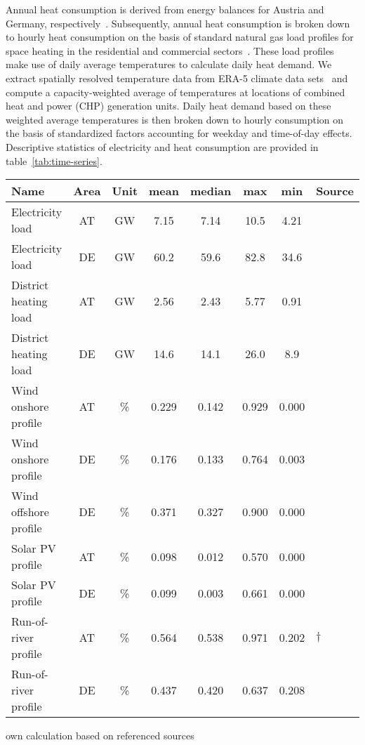 \documentclass[review, 3p, times, 12pt]{elsarticle} %
\begin{document}
Annual heat consumption is derived from energy balances for Austria and Germany, respectively~\citep{AGEB2018,
StatistikAustria2020}.
Subsequently, annual heat consumption is broken down to hourly heat consumption on the basis of standard natural gas load profiles for space heating in the residential and commercial sectors~\citep{Almbauer2008}.
These load profiles make use of daily average temperatures to calculate daily heat demand.
We extract spatially resolved temperature data from ERA-5 climate data sets~\citep{CCCS2017} and compute a capacity-weighted average of temperatures at locations of combined heat and power (CHP) generation units.
Daily heat demand based on these weighted average temperatures is then broken down to hourly consumption on the basis of standardized factors accounting for weekday and time-of-day effects.
Descriptive statistics of electricity and heat consumption are provided in table~\ref{tab:time-series}.

\begin{table*}[h!t]
\centering
\begin{threeparttable}
\caption{Descriptive data of time series (2016)}\label{tab:time-series}
\begin{tabular}{l c c c c c c l}
\toprule
Name & Area & Unit & mean & median & max & min & Source   \\
\midrule
Electricity load & AT & GW & 7.15 & 7.14 & 10.5 & 4.21 &\cite{opsd2019}     \\
Electricity load & DE & GW & 60.2 & 59.6 & 82.8 & 34.6 &\cite{opsd2019}     \\
District heating load\tnote{$\dagger$} & AT & GW & 2.56 & 2.43 & 5.77 & 0.91 & \cite{CCCS2017, StatistikAustria2020}\\
District heating load\tnote{$\dagger$} & DE & GW & 14.6 & 14.1 & 26.0 & 8.9 & \cite{CCCS2017, AGEB2018} \\
Wind onshore profile & AT &\%   & 0.229 & 0.142 & 0.929 & 0.000 &\cite{opsd2019}         \\
Wind onshore profile & DE &\%   & 0.176 & 0.133 & 0.764 & 0.003 &\cite{opsd2019}         \\
Wind offshore profile & DE &\%   & 0.371 & 0.327 & 0.900 & 0.000 &\cite{opsd2019}         \\
Solar PV profile\tnote{$\dagger$ } & AT &\%   & 0.098 & 0.012 & 0.570 & 0.000 & \cite{opsd2019, Biermayr2019}\\
Solar PV profile & DE &\%   & 0.099 & 0.003 & 0.661 & 0.000 &\cite{opsd2019}         \\
Run-of-river profile & AT &\%    & 0.564 & 0.538 & 0.971 & 0.202 & \cite{ENTSOE2020b}$\dagger$\\
Run-of-river profile & DE &\%   & 0.437 & 0.420 & 0.637 & 0.208 &\cite{ENTSOE2020b}\\
\bottomrule
\end{tabular}
\begin{tablenotes}
\small
\item[$\dagger$] own calculation based on referenced sources
\end{tablenotes}
\end{threeparttable}
\end{table*}
\end{document}
